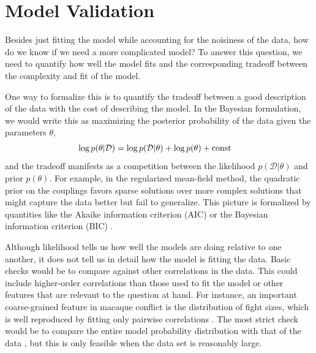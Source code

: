 \documentclass[aps,prl,twocolumn,nofootinbib]{revtex4-1}
\begin{document}
\section{Model Validation}
Besides just fitting the model while accounting for the noisiness of the data, how do we know if we need a more complicated model? To answer this question, we need to quantify how well the model fits and the corresponding tradeoff between the complexity and fit of the model.

One way to formalize this is to quantify the tradeoff between a good description of the data with the cost of describing the model. In the Bayesian formulation, we would write this as maximizing the posterior probability of the data given the parameters $\theta$,
\begin{align}
    \log p(\theta|\mathcal{D}) &= \log p(\mathcal{D}|\theta) +\log p(\theta) + {\rm const}
\end{align}
and the tradeoff manifests as a competition between the likelihood $p(\mathcal{D}|\theta)$ and prior $p(\theta)$. For example, in the regularized mean-field method, the quadratic prior on the couplings favors sparse solutions over more complex solutions that might capture the data better but fail to generalize.
This picture is formalized by quantities like the Akaike information criterion (AIC) or the Bayesian information criterion (BIC) \cite{Anonymous:mVL3xTtr}.

Although likelihood tells us how well the models are doing relative to one another, it does not tell us in detail how the model is fitting the data.
Basic checks would be to compare against other correlations in the data.  This could include higher-order correlations than those used to fit the model or other features that are relevant to the question at hand. For instance, an important coarse-grained feature in  macaque conflict is the distribution of fight sizes, which is well reproduced by fitting only pairwise correlations \cite{Daniels:2017cq}.
The most strict check would be to compare the entire model probability distribution with that of the data \cite{Lee:2015ev}, but this is only feasible when the data set is reasonably large.
\end{document}
